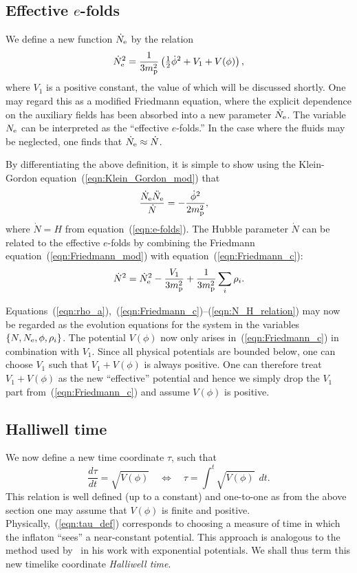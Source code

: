 \subsection{Effective $e$-folds}
We define a new function $\dot{N}_\mathrm{e}$ by the relation
%
\begin{equation}
  \dot{N}_\mathrm{e}^2 = 
  \frac{1}{3m_{\mathrm{p}}^2}\left({\textstyle\frac{1}{2}}\dot{\phi}^2 + V_1+V(\phi) \right),
  \label{eqn:Friedmann_c} 
\end{equation}
%
where $V_1$ is a positive constant, the value of which will be discussed shortly. One may regard this as a modified Friedmann equation, where the explicit dependence on the auxiliary fields has been absorbed into a new parameter $\dot{N}_\mathrm{e}$. The variable $N_\mathrm{e}$ can be interpreted as the ``effective $e$-folds.'' In the case where the fluids may be neglected, one finds that $\dot{N}_\mathrm{e}\approx\dot{N}$.

By differentiating the above definition, it is simple to show using the Klein-Gordon equation~(\ref{eqn:Klein_Gordon_mod}) that
%
\begin{align}
  \frac{\dot{N}_\mathrm{e} \ddot{N}_\mathrm{e}}{\dot{N}}  
  &=
  -\frac{\dot{\phi}^2}{2m_{\mathrm{p}}^2},
  \label{eqn:Raychaudhuri_c}
\end{align}
%
where $\dot{N}=H$ from equation~(\ref{eqn:e-folds}). The Hubble parameter $\dot{N}$ can be related to the effective $e$-folds by combining the Friedmann equation~(\ref{eqn:Friedmann_mod}) with equation~(\ref{eqn:Friedmann_c}):
%
\begin{equation}
  \dot{N}^2 = \dot{N}_\mathrm{e}^2 -\frac{V_1}{3m_{\mathrm{p}}^2} + \frac{1}{3m_{\mathrm{p}}^2}\sum_i\rho_i.
  \label{eqn:N_H_relation}
\end{equation}
%

Equations~(\ref{eqn:rho_a}),~(\ref{eqn:Friedmann_c})--(\ref{eqn:N_H_relation}) may now be regarded as the evolution equations for the system in the variables $\{N,N_\mathrm{e},\phi,\rho_i\}$.  The potential $V(\phi)$ now only arises in~(\ref{eqn:Friedmann_c}) in combination with $V_1$.  Since all physical potentials are bounded below, one can choose $V_1$ such that $V_1+V(\phi)$ is always positive. One can therefore treat $V_1+V(\phi)$ as the new ``effective'' potential and hence we simply drop the $V_1$ part from~(\ref{eqn:Friedmann_c}) and assume $V(\phi)$ is positive.

\subsection{Halliwell time}
%
We now define a new time coordinate $\tau$, such that
%
\begin{equation}
  \frac{d\tau}{dt} 
  = 
  \sqrt{V(\phi)} \quad\Leftrightarrow\quad \tau 
  = 
  \int^t \sqrt{V(\phi)}\:\: dt.
  \label{eqn:tau_def}
\end{equation}
%
This relation is well defined (up to a constant) and one-to-one as from the above section one may assume that $V(\phi)$ is finite and positive. Physically,~(\ref{eqn:tau_def}) corresponds to choosing a measure of time in which the inflaton ``sees'' a near-constant potential. This approach is analogous to the method used by~\citet{halliwell_scalar_1987} in his work with exponential potentials. We shall thus term this new timelike coordinate {\em Halliwell time}.

